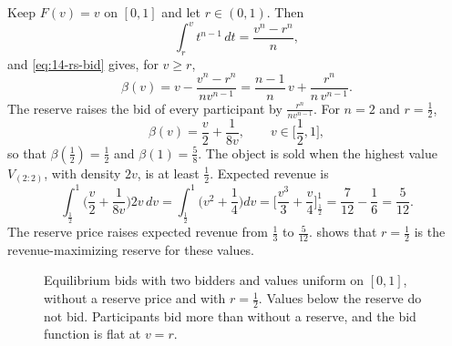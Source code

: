 \begin{example}\label{ex:14-uniform-reserve}
Keep $F(v)=v$ on $[0,1]$ and let $r\in(0,1)$. Then
\[
\int_r^v t^{n-1}\,dt=\frac{v^n-r^n}{n},
\]
and \eqref{eq:14-rs-bid} gives, for $v\ge r$,
\[
\beta(v)=v-\frac{v^n-r^n}{nv^{n-1}}=\frac{n-1}{n}\,v+\frac{r^n}{n\,v^{n-1}}.
\]
The reserve raises the bid of every participant by $\frac{r^n}{nv^{n-1}}$. For $n=2$ and $r=\frac12$,
\[
\beta(v)=\frac{v}{2}+\frac{1}{8v},\qquad v\in\Big[\frac12,1\Big],
\]
so that $\beta(\frac12)=\frac12$ and $\beta(1)=\frac58$. The object is sold when the highest value $V_{(2:2)}$, with density $2v$, is at least $\frac12$. Expected revenue is
\[
\int_{\frac{1}{2}}^{1}\Big(\frac{v}{2}+\frac{1}{8v}\Big)2v\,dv=\int_{\frac{1}{2}}^{1}\Big(v^2+\frac14\Big)dv=\Big[\frac{v^3}{3}+\frac{v}{4}\Big]_{\frac{1}{2}}^{1}=\frac{7}{12}-\frac{1}{6}=\frac{5}{12}.
\]
The reserve price raises expected revenue from $\frac13$ to $\frac{5}{12}$.  shows that $r=\frac12$ is the revenue-maximizing reserve for these values.
\end{example}

\begin{figure}[htbp]
\centering
{}
\caption{Equilibrium bids with two bidders and values uniform on $[0,1]$, without a reserve price and with $r=\frac12$. Values below the reserve do not bid. Participants bid more than without a reserve, and the bid function is flat at $v=r$.}\label{fig:14-rs-reserve}
\end{figure}


